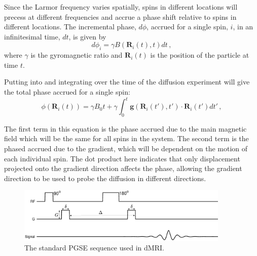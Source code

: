 Since the Larmor frequency varies spatially, spins in different locations will precess at different frequencies and accrue a phase shift relative to spins in different locations. 
The incremental phase, $d\phi$, accrued for a single spin, $i$, in an infinitesimal time, $dt$, %
is given by
\begin{equation}
  d\phi_i = \gamma B(\mathbf{R}_i(t), t) dt\,,
  \label{eq:dphi}
\end{equation}
where $\gamma$ is the gyromagnetic ratio and  $\mathbf{R}_i(t)$ is the position of the particle at time $t$. %

Putting  into  and integrating over the time of the diffusion experiment will give the total phase accrued for a single spin:
\begin{equation}
  \phi(\mathbf{R}_i(t)) = \gamma B_0t + \gamma\int_0^t\mathbf{g}(\mathbf{R}_i(t'), t')\cdot\mathbf{R}_i(t')dt'\,,
  \label{eq:phase_singlespin}
\end{equation}


The first term in this equation is the phase accrued due to the main magnetic field which will be the same for all spins in the system.
The second term is the phased accrued due to the gradient, which will be dependent on the motion of each individual spin.
The dot product here indicates that only displacement projected onto the gradient direction affects the phase, allowing the gradient direction to be used to probe the diffusion in different directions.

\begin{figure}
  \centering
  \includegraphics[width=0.9\textwidth]{figures/background/PGSE_diagram.eps}
  \caption{The standard \acl{PGSE} sequence used in \acs{dMRI}.}
  \label{fig:PGSE_diagram}
\end{figure}

